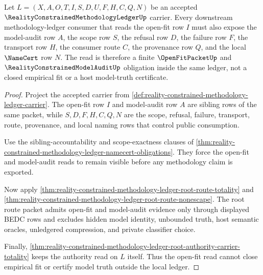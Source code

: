 \begin{theorem}
\label{thm:reality-constrained-methodology-ledger-open-fit-model-audit-obligation}
Let $L=(X,A,O,T,I,S,D,U,F,H,C,Q,N)$ be an accepted $\RealityConstrainedMethodologyLedgerUp$ carrier. Every downstream methodology-ledger consumer that reads the open-fit row $I$ must also expose the model-audit row $A$, the scope row $S$, the refusal row $D$, the failure row $F$, the transport row $H$, the consumer route $C$, the provenance row $Q$, and the local $\NameCert$ row $N$. The read is therefore a finite $\OpenFitPacketUp$ and $\RealityConstrainedModelAuditUp$ obligation inside the same ledger, not a closed empirical fit or a host model-truth certificate.
\end{theorem}
\begin{proof}
Project the accepted carrier from \autoref{def:reality-constrained-methodology-ledger-carrier}. The open-fit row $I$ and model-audit row $A$ are sibling rows of the same packet, while $S,D,F,H,C,Q,N$ are the scope, refusal, failure, transport, route, provenance, and local naming rows that control public consumption.

Use the sibling-accountability and scope-exactness clauses of \autoref{thm:reality-constrained-methodology-ledger-namecert-obligations}. They force the open-fit and model-audit reads to remain visible before any methodology claim is exported.

Now apply \autoref{thm:reality-constrained-methodology-ledger-root-route-totality} and \autoref{thm:reality-constrained-methodology-ledger-root-route-nonescape}. The root route packet admits open-fit and model-audit evidence only through displayed BEDC rows and excludes hidden model identity, unbounded truth, host semantic oracles, unledgered compression, and private classifier choice.

Finally, \autoref{thm:reality-constrained-methodology-ledger-root-authority-carrier-totality} keeps the authority read on $L$ itself. Thus the open-fit read cannot close empirical fit or certify model truth outside the local ledger.
\end{proof}


